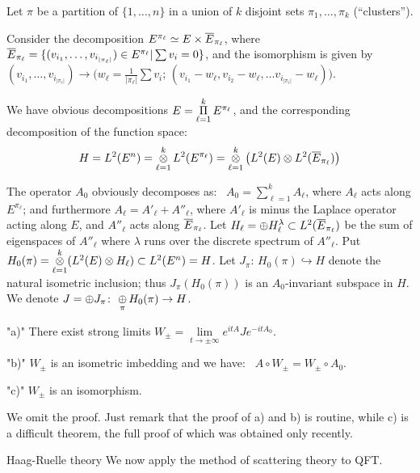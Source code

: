 Let $\pi$ be a partition  of $\{1,\dotsc,n\}$ in a union of
$k$ disjoint sets $\pi_1,\dotsc,\pi_k$ (``clusters'').

Consider the decomposition $E^{\pi_\ell}\simeq E\times
\overline{E}_{\pi_\ell}$, where
$\overline{E}_{\pi_\ell}=\{(v_{i_1},\dotsc,v_{i_{\vert\pi_\ell\vert}})\in
E^{\pi_\ell}\vert \sum v_i=0\}$, and the isomorphism is given by
$(v_{i_1},\dotsc,v_{i_{\vert\pi_\ell\vert}})\to
(w_\ell=\frac{1}{\vert\pi_\ell\vert}\sum v_i$;
$(v_{i_1}-w_\ell,v_{i_2}-w_\ell,\dotsc
v_{i_{\vert\pi_\ell\vert}}-w_\ell))$.

We have obvious decompositions $E=\Piop_{\ell=1}^k
E^{\pi_\ell}$, and the corresponding decomposition of the
function space:
$$
H=L^2(E^n)=\otimesop_{\ell=1}^k L^2(E^{\pi_\ell})=
\otimesop_{\ell=1}^k \left(L^2(E)\otimes
L^2(\Ebar_{\pi_\ell})\right)
$$

The operator $A_0$ obviously decomposes as: \
$A_0=\sum\limits_{\ell=1}^k A_\ell$, where $A_\ell$ acts
along $E^{\pi_\ell}$; and furthermore
$A_\ell=A'_\ell+A''_\ell$, where $A'_\ell$ is minus the
Laplace operator acting along $E$, and $A''_\ell$ acts along
$\overline{E}_{\pi_\ell}$.
Let $H_\ell=\oplus H_\ell^\lambda\subset
L^2(\overline{E}_{\pi_\ell})$ be the sum of  eigenspaces of
$A''_\ell$ where $\lambda$ runs over the discrete spectrum
of $A''_\ell$.
Put $H_0(\pi)=\otimesop_{\ell=1}^k(L^2(E)\otimes
H_\ell)\subset L^2(E^n)=H$.
Let $J_\pi\colon\,H_0(\pi)\hookrightarrow H$ denote the
natural isometric inclusion; thus $J_\pi(H_0(\pi))$ is an
$A_0$-invariant subspace in $H$.
We denote $J=\oplus J_\pi\colon\, \oplusop_{\pi}H_0(\pi)\to
H$.

\roster
\runinitem"{\rm a)}"
There exist strong limits $W_\pm=\lim\limits_{t\to\pm\infty}
e^{itA}Je^{-itA_0}$.

\item"{\rm b)}"
$W_\pm$ is an isometric imbedding and we have: \
$A\circ W_\pm=W_\pm\circ A_0$.

\item"{\rm c)}"
$W_\pm$ is an isomorphism.
\endroster
\endproclaim

We omit the proof.
Just remark that the proof of a) and b) is routine, while c)
is a difficult theorem, the full proof of which was obtained
only recently.


\smallskip\noindent


 {Haag-Ruelle theory}\endsubhead
 We now  apply the method of scattering
theory to QFT.


